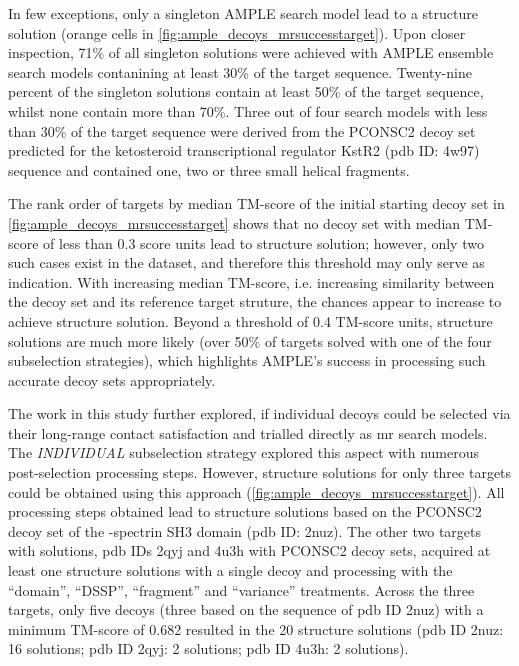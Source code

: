 In few exceptions, only a singleton AMPLE search model lead to a structure solution (orange cells in \cref{fig:ample_decoys_mrsuccesstarget}). Upon closer inspection, 71\% of all singleton solutions were achieved with AMPLE ensemble search models contanining at least 30\% of the target sequence. Twenty-nine percent of the singleton solutions contain at least 50\% of the target sequence, whilst none contain more than 70\%. Three out of four search models with less than 30\% of the target sequence were derived from the PCONSC2 decoy set predicted for the ketosteroid transcriptional regulator KstR2 (\gls{pdb} ID: 4w97) sequence and contained one, two or three small helical fragments.  

The rank order of targets by median TM-score of the initial starting decoy set in \cref{fig:ample_decoys_mrsuccesstarget} shows that no decoy set with median TM-score of less than 0.3 score units lead to structure solution; however, only two such cases exist in the dataset, and therefore this threshold may only serve as indication. With increasing median TM-score, i.e. increasing similarity between the decoy set and its reference target struture, the chances appear to increase to achieve structure solution. Beyond a threshold of 0.4 TM-score units, structure solutions are much more likely (over 50\% of targets solved with one of the four subselection strategies), which highlights AMPLE's success in processing such accurate decoy sets appropriately.

The work in this study further explored, if individual decoys could be selected via their long-range contact satisfaction and trialled directly as \gls{mr} search models. The \textit{INDIVIDUAL} subselection strategy explored this aspect with numerous post-selection processing steps. However, structure solutions for only three targets could be obtained using this approach (\cref{fig:ample_decoys_mrsuccesstarget}). All processing steps obtained lead to structure solutions based on the PCONSC2 decoy set of the \textalpha-spectrin SH3 domain (\gls{pdb} ID: 2nuz). The other two targets with solutions, \gls{pdb} IDs 2qyj and 4u3h with PCONSC2 decoy sets, acquired at least one structure solutions with a single decoy and processing with the ``domain'', ``DSSP'', ``fragment'' and ``variance'' treatments. Across the three targets, only five decoys (three based on the sequence of \gls{pdb} ID 2nuz) with a minimum TM-score of 0.682 resulted in the 20 structure solutions (\gls{pdb} ID 2nuz: 16 solutions; \gls{pdb} ID 2qyj: 2 solutions; \gls{pdb} ID 4u3h: 2 solutions).

